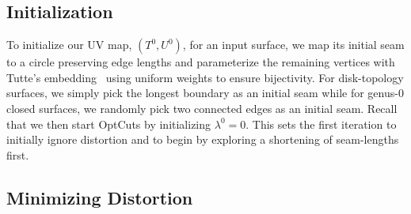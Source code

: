 \subsection{Initialization}
To initialize our UV map, $(T^0,U^0)$, for an input surface, we map its initial seam to a circle preserving edge lengths and parameterize the remaining vertices with Tutte's embedding~ using uniform weights to ensure bijectivity.
For disk-topology surfaces, we simply pick the longest boundary as an initial seam while for genus-0 closed surfaces, we randomly pick two connected edges as an initial seam. 
Recall that we then start OptCuts by initializing $\lambda^0 = 0$. This sets the first iteration to initially ignore distortion and to begin by exploring a shortening of seam-lengths first.


\subsection{Minimizing Distortion}
\label{sec:descentStep}


